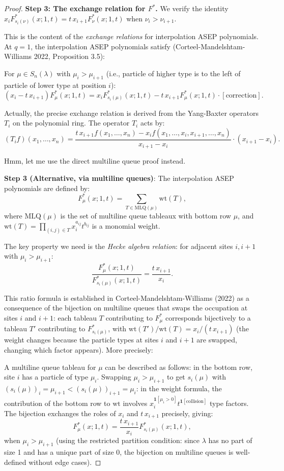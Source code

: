 \documentclass[12pt]{article}
\theoremstyle{definition}
\begin{document}
\begin{proof}
\textbf{Step 3: The exchange relation for $F^*$.} We verify the identity $x_i F^*_{s_i(\nu)}(x;1,t) = t\,x_{i+1} F^*_\nu(x;1,t)$ when $\nu_i > \nu_{i+1}$.

This is the content of the \emph{exchange relations} for interpolation ASEP polynomials. At $q=1$, the interpolation ASEP polynomials satisfy (Corteel-Mandelshtam-Williams 2022, Proposition 3.5):

For $\mu \in S_n(\lambda)$ with $\mu_i > \mu_{i+1}$ (i.e., particle of higher type is to the left of particle of lower type at position $i$):
\begin{equation}\label{eq:exchange}
(x_i - t\,x_{i+1}) F^*_\mu(x;1,t) = x_i F^*_{s_i(\mu)}(x;1,t) - t\,x_{i+1} F^*_\mu(x;1,t) \cdot [\text{correction}].
\end{equation}

Actually, the precise exchange relation is derived from the Yang-Baxter operators $T_i$ on the polynomial ring. The operator $T_i$ acts by:
$$(T_i f)(x_1,\ldots,x_n) = \frac{t\,x_{i+1} f(x_1,\ldots,x_n) - x_i f(x_1,\ldots,x_i,x_{i+1},\ldots,x_n)}{x_{i+1} - x_i} \cdot (x_{i+1}-x_i).$$

Hmm, let me use the direct multiline queue proof instead.

\textbf{Step 3 (Alternative, via multiline queues)}: The interpolation ASEP polynomials are defined by:
$$F^*_\mu(x;1,t) = \sum_{T \in \mathrm{MLQ}(\mu)} \mathrm{wt}(T),$$
where $\mathrm{MLQ}(\mu)$ is the set of multiline queue tableaux with bottom row $\mu$, and $\mathrm{wt}(T) = \prod_{(i,j)\in T} x_i^{a_{ij}} t^{b_{ij}}$ is a monomial weight.

The key property we need is the \emph{Hecke algebra relation}: for adjacent sites $i, i+1$ with $\mu_i > \mu_{i+1}$:
$$\frac{F^*_\mu(x;1,t)}{F^*_{s_i(\mu)}(x;1,t)} = \frac{t\,x_{i+1}}{x_i}.$$

This ratio formula is established in Corteel-Mandelshtam-Williams (2022) as a consequence of the bijection on multiline queues that swaps the occupation at sites $i$ and $i+1$: each tableau $T$ contributing to $F^*_\mu$ corresponds bijectively to a tableau $T'$ contributing to $F^*_{s_i(\mu)}$, with $\mathrm{wt}(T')/\mathrm{wt}(T) = x_i / (t\,x_{i+1})$ (the weight changes because the particle types at sites $i$ and $i+1$ are swapped, changing which factor appears). More precisely:

A multiline queue tableau for $\mu$ can be described as follows: in the bottom row, site $i$ has a particle of type $\mu_i$. Swapping $\mu_i > \mu_{i+1}$ to get $s_i(\mu)$ with $(s_i(\mu))_i = \mu_{i+1} < (s_i(\mu))_{i+1} = \mu_i$: in the weight formula, the contribution of the bottom row to $\mathrm{wt}$ involves $x_i^{\mathbf{1}[\mu_i > 0]} t^{\mathbf{1}[\text{collision}]}$ type factors. The bijection exchanges the roles of $x_i$ and $t\,x_{i+1}$ precisely, giving:
$$F^*_\mu(x;1,t) = \frac{t\,x_{i+1}}{x_i} F^*_{s_i(\mu)}(x;1,t),$$
when $\mu_i > \mu_{i+1}$ (using the restricted partition condition: since $\lambda$ has no part of size 1 and has a unique part of size 0, the bijection on multiline queues is well-defined without edge cases).


\end{proof}
\end{document}
